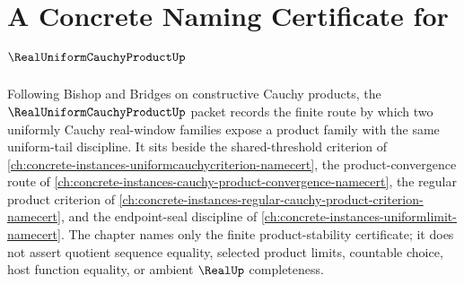 \chapter{A Concrete Naming Certificate for $\RealUniformCauchyProductUp$}
\label{ch:concrete-instances-real-uniform-cauchy-product-namecert}

Following Bishop and Bridges on constructive Cauchy products, the $\RealUniformCauchyProductUp$ packet records the finite route by which two uniformly Cauchy real-window families expose a product family with the same uniform-tail discipline. It sits beside the shared-threshold criterion of \autoref{ch:concrete-instances-uniformcauchycriterion-namecert}, the product-convergence route of \autoref{ch:concrete-instances-cauchy-product-convergence-namecert}, the regular product criterion of \autoref{ch:concrete-instances-regular-cauchy-product-criterion-namecert}, and the endpoint-seal discipline of \autoref{ch:concrete-instances-uniformlimit-namecert}. The chapter names only the finite product-stability certificate; it does not assert quotient sequence equality, selected product limits, countable choice, host function equality, or ambient $\RealUp$ completeness.

